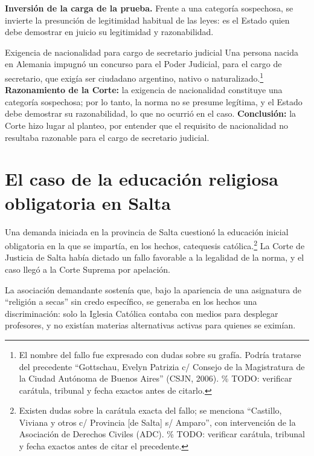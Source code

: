 \documentclass[12pt,oneside]{book}
\begin{document}
\begin{important}
\textbf{Inversión de la carga de la prueba.} Frente a una categoría sospechosa, se invierte la presunción de legitimidad habitual de las leyes: es el Estado quien debe demostrar en juicio su legitimidad y razonabilidad.
\end{important}

\begin{example}{Exigencia de nacionalidad para cargo de secretario judicial}
Una persona nacida en Alemania impugnó un concurso para el Poder Judicial, para el cargo de secretario, que exigía ser ciudadano argentino, nativo o naturalizado.\footnote{El nombre del fallo fue expresado con dudas sobre su grafía. Podría tratarse del precedente ``Gottschau, Evelyn Patrizia c/ Consejo de la Magistratura de la Ciudad Autónoma de Buenos Aires'' (CSJN, 2006). \% TODO: verificar carátula, tribunal y fecha exactos antes de citarlo.} \textbf{Razonamiento de la Corte:} la exigencia de nacionalidad constituye una categoría sospechosa; por lo tanto, la norma no se presume legítima, y el Estado debe demostrar su razonabilidad, lo que no ocurrió en el caso. \textbf{Conclusión:} la Corte hizo lugar al planteo, por entender que el requisito de nacionalidad no resultaba razonable para el cargo de secretario judicial.
\end{example}

\section{El caso de la educación religiosa obligatoria en Salta}

Una demanda iniciada en la provincia de Salta cuestionó la educación inicial obligatoria en la que se impartía, en los hechos, catequesis católica.\footnote{Existen dudas sobre la carátula exacta del fallo; se menciona ``Castillo, Viviana y otros c/ Provincia [de Salta] s/ Amparo'', con intervención de la Asociación de Derechos Civiles (ADC). \% TODO: verificar carátula, tribunal y fecha exactos antes de citar el precedente.} La Corte de Justicia de Salta había dictado un fallo favorable a la legalidad de la norma, y el caso llegó a la Corte Suprema por apelación.

La asociación demandante sostenía que, bajo la apariencia de una asignatura de ``religión a secas'' sin credo específico, se generaba en los hechos una discriminación: solo la Iglesia Católica contaba con medios para desplegar profesores, y no existían materias alternativas activas para quienes se eximían.
\end{document}

